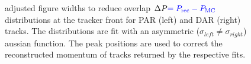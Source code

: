 \begin{figure}[h]
\hspace{-0.6in}

\caption{
  \label{fig:sindrum_ii_fig_08_fit} 
  {\blue adjusted figure widths to reduce overlap}
  $\Delta P {\color{blue} = P_{\rm rec} - P_{\rm MC}}$ distributions at the tracker front for PAR (left) and DAR (right) tracks. The distributions  
  are fit with  {\blue an} asymmetric ($\sigma_{left} \ne \sigma_{right}$) aussian function. 
  {\blue The p}eak positions are used to correct the reconstructed  {\blue momentum} of  tracks 
   {\blue returned by} the respective fits.
}
\end{figure}


